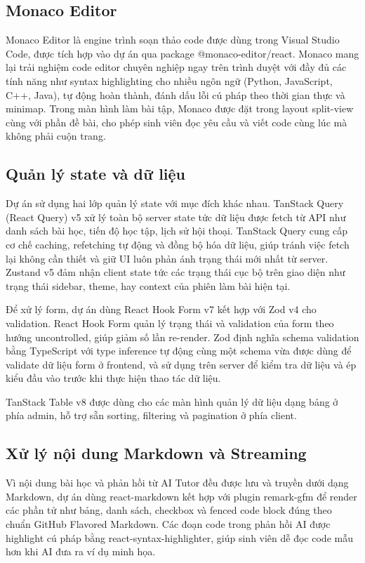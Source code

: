 \documentclass[../main.tex]{subfiles}
\begin{document}
\subsection{Monaco Editor}

Monaco Editor là engine trình soạn thảo code được dùng trong Visual Studio Code, được tích hợp vào dự án qua package @monaco-editor/react. Monaco mang lại trải nghiệm code editor chuyên nghiệp ngay trên trình duyệt với đầy đủ các tính năng như syntax highlighting cho nhiều ngôn ngữ (Python, JavaScript, C++, Java), tự động hoàn thành, đánh dấu lỗi cú pháp theo thời gian thực và minimap. Trong màn hình làm bài tập, Monaco được đặt trong layout split-view cùng với phần đề bài, cho phép sinh viên đọc yêu cầu và viết code cùng lúc mà không phải cuộn trang.

\subsection{Quản lý state và dữ liệu}

Dự án sử dụng hai lớp quản lý state với mục đích khác nhau. TanStack Query (React Query) v5 xử lý toàn bộ server state tức dữ liệu được fetch từ API như danh sách bài học, tiến độ học tập, lịch sử hội thoại. TanStack Query cung cấp cơ chế caching, refetching tự động và đồng bộ hóa dữ liệu, giúp tránh việc fetch lại không cần thiết và giữ UI luôn phản ánh trạng thái mới nhất từ server. Zustand v5 đảm nhận client state tức các trạng thái cục bộ trên giao diện như trạng thái sidebar, theme, hay context của phiên làm bài hiện tại.

Để xử lý form, dự án dùng React Hook Form v7 kết hợp với Zod v4 cho validation. React Hook Form quản lý trạng thái và validation của form theo hướng uncontrolled, giúp giảm số lần re-render. Zod định nghĩa schema validation bằng TypeScript với type inference tự động cùng một schema vừa được dùng để validate dữ liệu form ở frontend, và sử dụng trên server để kiểm tra dữ liệu và ép kiểu đầu vào trước khi thực hiện thao tác dữ liệu.

TanStack Table v8 được dùng cho các màn hình quản lý dữ liệu dạng bảng ở phía admin, hỗ trợ sẵn sorting, filtering và pagination ở phía client.

\subsection{Xử lý nội dung Markdown và Streaming}

Vì nội dung bài học và phản hồi từ AI Tutor đều được lưu và truyền dưới dạng Markdown, dự án dùng react-markdown kết hợp với plugin remark-gfm để render các phần tử như bảng, danh sách, checkbox và fenced code block đúng theo chuẩn GitHub Flavored Markdown. Các đoạn code trong phản hồi AI được highlight cú pháp bằng react-syntax-highlighter, giúp sinh viên dễ đọc code mẫu hơn khi AI đưa ra ví dụ minh họa.
\end{document}
